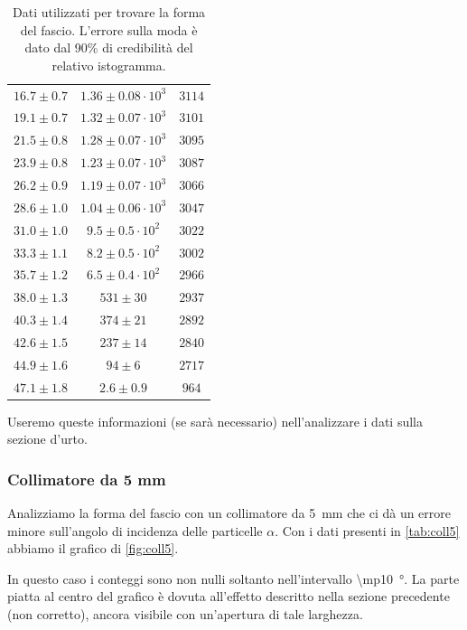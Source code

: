 \begin{table}[h]
\begin{tabular}{c|c|c}
$ 16.7 \pm 0.7 $ & $ 1.36 \pm 0.08  \cdot 10^{3} $ & $ 3114 $ \\ 
$ 19.1 \pm 0.7 $ & $ 1.32 \pm 0.07  \cdot 10^{3} $ & $ 3101 $ \\ 
$ 21.5 \pm 0.8 $ & $ 1.28 \pm 0.07  \cdot 10^{3} $ & $ 3095 $ \\ 
$ 23.9 \pm 0.8 $ & $ 1.23 \pm 0.07  \cdot 10^{3} $ & $ 3087 $ \\ 
$ 26.2 \pm 0.9 $ & $ 1.19 \pm 0.07  \cdot 10^{3} $ & $ 3066 $ \\ 
$ 28.6 \pm 1.0 $ & $ 1.04 \pm 0.06  \cdot 10^{3} $ & $ 3047 $ \\ 
$ 31.0 \pm 1.0 $ & $ 9.5 \pm 0.5    \cdot 10^{2} $ & $ 3022 $ \\ 
$ 33.3 \pm 1.1 $ & $ 8.2 \pm 0.5    \cdot 10^{2} $ & $ 3002 $ \\ 
$ 35.7 \pm 1.2 $ & $ 6.5 \pm 0.4    \cdot 10^{2} $ & $ 2966 $ \\ 
$ 38.0 \pm 1.3 $ & $ 531 \pm 30 $ & $ 2937 $ \\ 
$ 40.3 \pm 1.4 $ & $ 374 \pm 21 $ & $ 2892 $ \\ 
$ 42.6 \pm 1.5 $ & $ 237 \pm 14 $ & $ 2840 $ \\ 
$ 44.9 \pm 1.6 $ & $ 94 \pm 6 $ & $ 2717 $ \\ 
$ 47.1 \pm 1.8 $ & $ 2.6 \pm 0.9 $ & $ 964 $ \\ 
\end{tabular}

\caption{Dati utilizzati per trovare la forma del fascio. L'errore sulla moda è dato dal 90\% di credibilità del relativo istogramma.}
\label{tab:forma}
\end{table}

Useremo queste informazioni (se sarà necessario) nell'analizzare i dati sulla sezione d'urto.

\subsubsection{Collimatore da 5\! mm}

Analizziamo la forma del fascio con un collimatore da \SI{5}{mm} che ci dà un errore minore sull'angolo di incidenza delle particelle $\alpha$.
Con i dati presenti in \autoref{tab:coll5} abbiamo il grafico di \autoref{fig:coll5}.

In questo caso i conteggi sono non nulli soltanto nell'intervallo \SI{\mp10}{\degree}. La parte piatta al centro del grafico è dovuta all'effetto descritto nella sezione precedente (non corretto), ancora visibile con un'apertura di tale larghezza.


